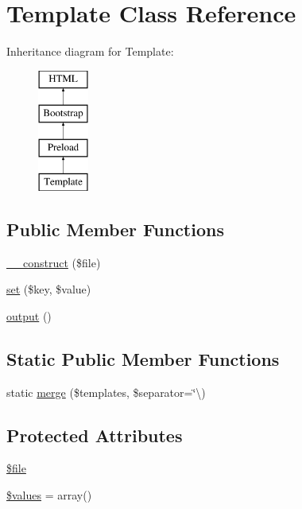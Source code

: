 \hypertarget{class_w_a_f_f_l_e_1_1_framework_1_1_engines_1_1_template}{}\section{Template Class Reference}
\label{class_w_a_f_f_l_e_1_1_framework_1_1_engines_1_1_template}
Inheritance diagram for Template\+:\begin{figure}[H]
\begin{center}
\leavevmode
\includegraphics[height=4.000000cm]{class_w_a_f_f_l_e_1_1_framework_1_1_engines_1_1_template}
\end{center}
\end{figure}
\subsection*{Public Member Functions}
\begin{DoxyCompactItemize}
\item 
\hyperlink{class_w_a_f_f_l_e_1_1_framework_1_1_engines_1_1_template_a8ef77288a5f940c68ebc57fdf0102078}{\+\_\+\+\_\+construct} (\$file)
\item 
\hyperlink{class_w_a_f_f_l_e_1_1_framework_1_1_engines_1_1_template_aab787bd83f84f4215dceb35f7c305eee}{set} (\$key, \$value)
\item 
\hyperlink{class_w_a_f_f_l_e_1_1_framework_1_1_engines_1_1_template_a3939045b11b9aaefdf692feb963f0dfc}{output} ()
\end{DoxyCompactItemize}
\subsection*{Static Public Member Functions}
\begin{DoxyCompactItemize}
\item 
static \hyperlink{class_w_a_f_f_l_e_1_1_framework_1_1_engines_1_1_template_a35932dacc685dbaaf413695f6dd67f36}{merge} (\$templates, \$separator=\char`\"{}\textbackslash{})
\end{DoxyCompactItemize}
\subsection*{Protected Attributes}
\begin{DoxyCompactItemize}
\item 
\hyperlink{class_w_a_f_f_l_e_1_1_framework_1_1_engines_1_1_template_a823f9d8bf697d2dd19672687804d05b4}{\$file}
\item 
\hyperlink{class_w_a_f_f_l_e_1_1_framework_1_1_engines_1_1_template_a46220846a73e3618f122b00d8c898308}{\$values} = array()
\end{DoxyCompactItemize}


